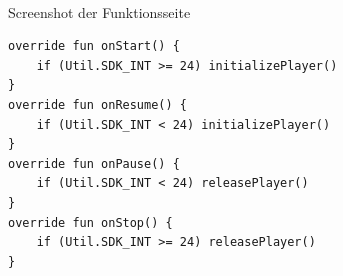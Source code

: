 \begin{figure}[!htb]
    \centering
    \begin{minipage}[t]{0.4\textwidth}
        \caption{Screenshot der Funktionsseite}
        \\
        \label{fig:screenshot_knowledge_function_page}
    \end{minipage}
\end{figure}

\begin{figure}[bht]
    \begin{lstlisting}[caption=Verwaltung der ExoPlayer Ressourcen, label=list:exoplayer_lifecycle]
override fun onStart() {
    if (Util.SDK_INT >= 24) initializePlayer()
}
override fun onResume() {
    if (Util.SDK_INT < 24) initializePlayer()
}
override fun onPause() {
    if (Util.SDK_INT < 24) releasePlayer()
}
override fun onStop() {
    if (Util.SDK_INT >= 24) releasePlayer()
}
    \end{lstlisting}
\end{figure}

